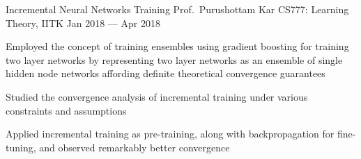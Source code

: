 \cventry
	{Incremental Neural Networks Training}
	{Prof.\ Purushottam Kar}
	{CS777: Learning Theory, IITK}
	{Jan 2018 --- Apr 2018}
	{%
		\begin{cvitems}
			\item Employed the concept of training ensembles using gradient boosting for training two layer networks by representing two layer networks as an ensemble of single hidden node networks affording definite theoretical convergence guarantees
			\item Studied the convergence analysis of incremental training under various constraints and assumptions
			\item Applied incremental training as pre-training, along with backpropagation for fine-tuning, and observed remarkably better convergence
		\end{cvitems}
	}
	
